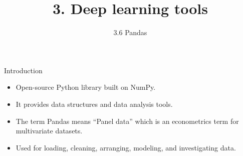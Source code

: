 \documentclass{beamer}
\title{3. Deep learning tools}
\subtitle{3.6 Pandas}
\begin{document}
\maketitle

\begin{frame}{Introduction}

\begin{itemize}
\item Open-source Python library built on NumPy. 
\item It provides data structures and data analysis tools. 
\item The term Pandas means ``Panel data'' which is an econometrics term for multivariate datasets. 
\item Used for loading, cleaning, arranging, modeling, and investigating  data.
\end{itemize}
\end{frame}
\end{document}
